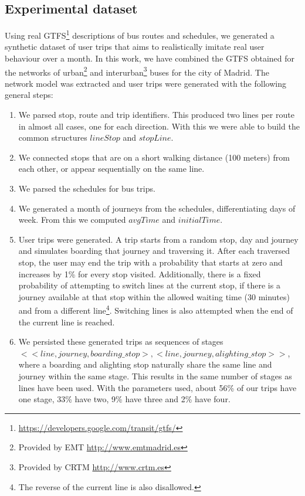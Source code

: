     \subsection{Experimental dataset}
    \label{sec:ctr:exp:data}
    Using real GTFS\footnote{\url{https://developers.google.com/transit/gtfs/}} descriptions of bus routes and schedules, we generated a synthetic dataset of user trips that aims to realistically imitate real user behaviour over a month. In this work, we have combined the GTFS obtained for the networks of urban\footnote{Provided by EMT \url{http://www.emtmadrid.es}} and interurban\footnote{Provided by CRTM \url{http://www.crtm.es}} buses for the city of Madrid. The network model was extracted and user trips were generated with the following general steps:
    
    \begin{enumerate}
        \item We parsed stop, route and trip identifiers. This produced two lines per route in almost all cases, one for each direction. With this we were able to build the common structures $lineStop$ and $stopLine$.
        \item We connected stops that are on a short walking distance (100 meters) from each other, or appear sequentially on the same line.
        \item We parsed the schedules for bus trips.
        \item We generated a month of journeys from the schedules, differentiating days of week. From this we computed $avgTime$ and $initialTime$.
        \item User trips were generated. A trip starts from a random stop, day and journey and simulates boarding that journey and traversing it. After each traversed stop, the user may end the trip with a probability that starts at zero and increases by 1\% for every stop visited. Additionally, there is a fixed probability of attempting to switch lines at the current stop, if there is a journey available at that stop within the allowed waiting time (30 minutes) and from a different line\footnote{The reverse of the current line is also disallowed.}. Switching lines is also attempted when the end of the current line is reached.
        \item We persisted these generated trips as sequences of stages \\ $<<line,journey,boarding\_stop>, <line,journey,alighting\_stop>>$,\\ where a boarding and alighting stop naturally share the same line and journey within the same stage. This results in the same number of stages as lines have been used. With the parameters used, about 56\% of our trips have one stage, 33\% have two, 9\% have three and 2\% have four.
    \end{enumerate}
    
